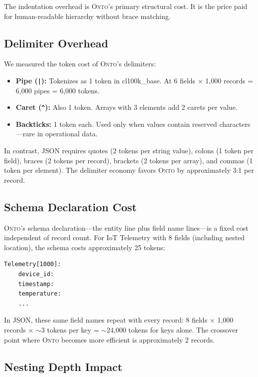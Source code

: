 \documentclass[10pt,twocolumn]{article}
\newcommand{\onto}{\textsc{Onto}\xspace}
\begin{document}
The indentation overhead is \onto's primary structural cost. It is the price paid for human-readable hierarchy without brace matching.

\subsection{Delimiter Overhead}

We measured the token cost of \onto's delimiters:

\begin{itemize}[leftmargin=*,itemsep=0.1em]
    \item \textbf{Pipe (\texttt{|}):} Tokenizes as 1 token in cl100k\_base. At 6 fields $\times$ 1,000 records = 6,000 pipes = 6,000 tokens.
    
    \item \textbf{Caret (\texttt{\^{}}):} Also 1 token. Arrays with 3 elements add 2 carets per value.
    
    \item \textbf{Backticks:} 1 token each. Used only when values contain reserved characters---rare in operational data.
\end{itemize}

In contrast, JSON requires quotes (2 tokens per string value), colons (1 token per field), braces (2 tokens per record), brackets (2 tokens per array), and commas (1 token per element). The delimiter economy favors \onto by approximately 3:1 per record.

\subsection{Schema Declaration Cost}

\onto's schema declaration---the entity line plus field name lines---is a fixed cost independent of record count. For IoT Telemetry with 8 fields (including nested location), the schema costs approximately 25 tokens:

\begin{lstlisting}[style=onto,basicstyle=\ttfamily\tiny]
Telemetry[1000]:
    device_id:
    timestamp:
    temperature:
    ...
\end{lstlisting}

In JSON, these same field names repeat with every record: 8 fields $\times$ 1,000 records $\times$ $\sim$3 tokens per key = $\sim$24,000 tokens for keys alone. The crossover point where \onto becomes more efficient is approximately 2 records.

\subsection{Nesting Depth Impact}
\end{document}
